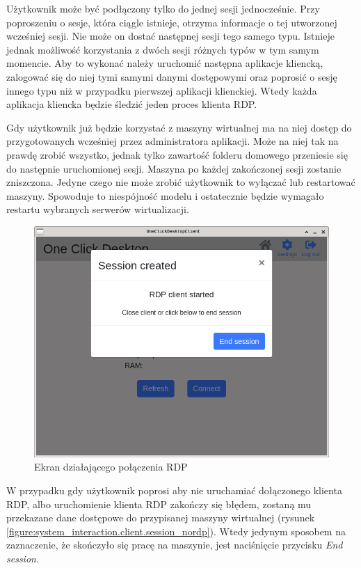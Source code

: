 \documentclass[../opis-rozwiazania.tex]{subfiles}
\begin{document}
Użytkownik może być podłączony tylko do jednej sesji jednocześnie.
Przy poproszeniu o sesje, która ciągle istnieje, otrzyma informacje o tej utworzonej wcześniej sesji.
Nie może on dostać następnej sesji tego samego typu.
Istnieje jednak możliwość korzystania z dwóch sesji różnych typów w tym samym momencie.
Aby to wykonać należy uruchomić następna aplikacje kliencką, zalogować się do niej tymi samymi danymi dostępowymi oraz poprosić o sesję innego typu niż w przypadku pierwszej aplikacji klienckiej.
Wtedy każda aplikacja kliencka będzie śledzić jeden proces klienta RDP.

Gdy użytkownik już będzie korzystać z maszyny wirtualnej ma na niej dostęp do przygotowanych wcześniej przez administratora aplikacji.
Może na niej tak na prawdę zrobić wszystko, jednak tylko zawartość folderu domowego przeniesie się do następnie uruchomionej sesji.
Maszyna po każdej zakończonej sesji zostanie zniszczona.
Jedyne czego nie może zrobić użytkownik to wyłączać lub restartować maszyny.
Spowoduje to niespójność modelu i ostatecznie będzie wymagało restartu wybranych serwerów wirtualizacji. 

\begin{figure}[ht!]
  \centering
  \includegraphics[width=\textwidth]{resources/client_session.png}
  \caption{Ekran działającego połączenia RDP}
  \label{figure:system_interaction.client.session}
\end{figure}

W przypadku gdy użytkownik poprosi aby nie uruchamiać dołączonego klienta RDP, albo uruchomienie klienta RDP zakończy się błędem, zostaną mu przekazane dane dostępowe do przypisanej maszyny wirtualnej (rysunek \ref{figure:system_interaction.client.session_nordp}).
Wtedy jedynym sposobem na zaznaczenie, że skończyło się pracę na maszynie, jest naciśnięcie przycisku \textit{End session}.
\end{document}

